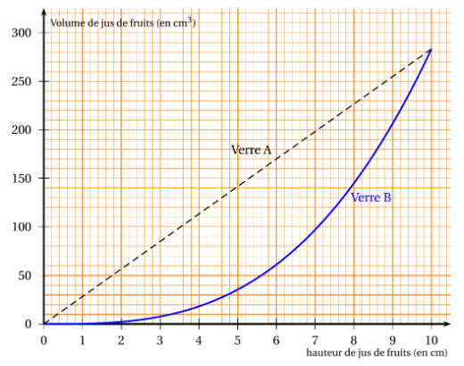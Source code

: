 \documentclass[14 pt, fleqn, pstricks]{extarticle}
\theoremstyle{plain}
\begin{document}
\includegraphics[scale=3]{Exo3.png}










\newpage
\end{document}
